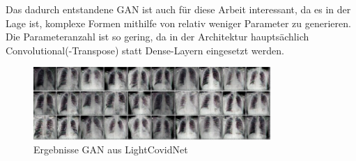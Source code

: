 Das dadurch entstandene GAN ist auch für diese Arbeit interessant, da es in der Lage ist, komplexe Formen mithilfe von relativ weniger Parameter zu generieren.
Die Parameteranzahl ist so gering, da in der Architektur hauptsächlich Convolutional(-Transpose) statt Dense-Layern eingesetzt werden.

\begin{figure}[H]
	\centering
	\includegraphics[width=9cm]{kapitel/2_stand_der_technik/img/light-covid-net-ergebnisse.png}
	\caption{Ergebnisse GAN aus LightCovidNet \cite{inspiration-dc-gan-med}}
\end{figure}

